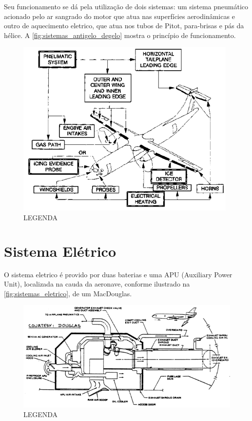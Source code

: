 Seu funcionamento se dá pela utilização de dois sistemas: um sistema pneumático acionado pelo ar sangrado do motor que atua nas superfícies aerodinâmicas e outro de aquecimento eletrico, que atua nos tubos de Pitot, para-brisas e pás da hélice.
A \autoref{fig:sistemas_antigelo_degelo} mostra o princípio de funcionamento.

\begin{figure}
\includegraphics[width=\textwidth]{images/parte3/sistemas_antigelo_degelo.png}
\caption{LEGENDA}
\label{fig:sistemas_antigelo_degelo}
\end{figure}


\section{Sistema Elétrico}

O sistema eletrico é provido por duas baterias e uma APU (Auxiliary Power Unit), localizada na cauda da aeronave, conforme ilustrado na \autoref{fig:sistemas_eletrico}, de um MacDouglas.

\begin{figure}
\includegraphics[width=\textwidth]{images/parte3/sistemas_eletrico.png}
\caption{LEGENDA}
\label{fig:sistemas_eletrico}
\end{figure}

